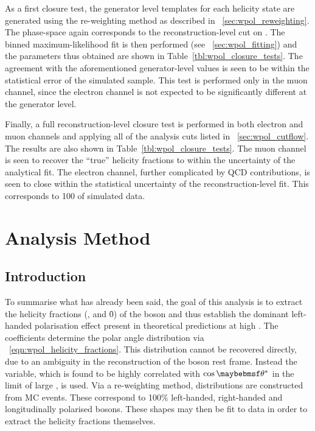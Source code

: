 As a first closure test, the generator level \LP templates for each helicity
state are generated using the re-weighting method as described in
\sec~\ref{sec:wpol_reweighting}. The phase-space again corresponds to the
reconstruction-level cut on \PtW. The binned maximum-likelihood fit is then
performed (see \sec~\ref{sec:wpol_fitting}) and the parameters thus obtained are
shown in Table~\ref{tbl:wpol_closure_tests}. The agreement with the
aforementioned generator-level values is seen to be within the statistical error
of the simulated sample. This test is performed only in the muon channel, since
the electron channel is not expected to be significantly different at the
generator level.

Finally, a full reconstruction-level closure test is performed in both electron
and muon channels and applying all of the analysis cuts listed in
\sec~\ref{sec:wpol_cutflow}. The results are also shown in
Table~\ref{tbl:wpol_closure_tests}. The muon channel is seen to recover the
``true'' helicity fractions to within the uncertainty of the analytical fit. The
electron channel, further complicated by \ac{QCD} contributions, is seen to
close within the statistical uncertainty of the reconstruction-level fit. This
corresponds to \unit{100}{\invpicobarn} of simulated data.



\section{Analysis Method}
\subsection{Introduction}
To summarise what has already been said, the goal of this analysis is to extract
the helicity fractions (\fL, \fR and \f0) of the \PW boson and thus establish
the dominant left-handed polarisation effect present in theoretical predictions
at high \PtW. The \ffi coefficients determine the polar angle distribution via
\eqn~\ref{eqn:wpol_helicity_fractions}. This distribution cannot be recovered
directly, due to an ambiguity in the reconstruction of the \PW boson rest
frame. Instead the \LP variable, which is found to be highly correlated with
$\cos\thetastar$ in the limit of large \PtW, is used. Via a re-weighting
method, \LP distributions are constructed from \ac{MC} events. These correspond
to 100\% left-handed, right-handed and longitudinally polarised \PW
bosons. These shapes may then be fit to data in order to extract the helicity
fractions themselves.

